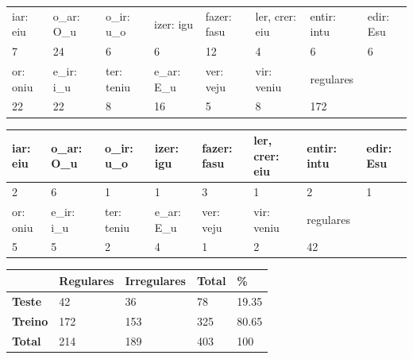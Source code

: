 \begin{table}[H]
\begin{center}
\begin{tabular}{llllllll}
iar: eiu & o\_ar: O\_u & o\_ir: u\_o & izer: igu & fazer: fasu & ler, crer: eiu & entir: intu & edir: Esu \\
7        & 24          & 6           & 6         & 12          & 4              & 6           & 6\\
\midrule
or: oniu & e\_ir: i\_u & ter: teniu & e\_ar: E\_u & ver: veju & vir: veniu & regulares & \\
22       & 22          & 8          & 16          & 5         & 8          & 172  &
\end{tabular}
\end{center}
\end{table}
\label{tab:g1}


\begin{table}[H]
\begin{center}
\begin{tabular}{llllllll}
iar: eiu & o\_ar: O\_u & o\_ir: u\_o & izer: igu & fazer: fasu & ler, crer: eiu & entir: intu & edir: Esu \\
\toprule
2        & 6          & 1           & 1        & 3         & 1              & 2          & 1 \\
\midrule
or: oniu & e\_ir: i\_u & ter: teniu & e\_ar: E\_u & ver: veju & vir: veniu & regulares \\

5        & 5           & 2          & 4           & 1         & 2          & 42      
\end{tabular}
\end{center}
\end{table}
\label{tab:g3}


\begin{table}[H]
\begin{center}
\begin{tabular}{lllll}
\hline
 & \textbf{Regulares} & \textbf{Irregulares} & \textbf{Total} & \textbf{\%} \\ \hline
\textbf{Teste} & 42 & 36 & 78 & 19.35 \\ \hline
\textbf{Treino} & 172 & 153 & 325 & 80.65 \\ \hline
\textbf{Total} & 214 & 189 & 403 & 100 \\ \hline
\end{tabular}
\end{center}
\end{table}
\label{tab:ratios}

